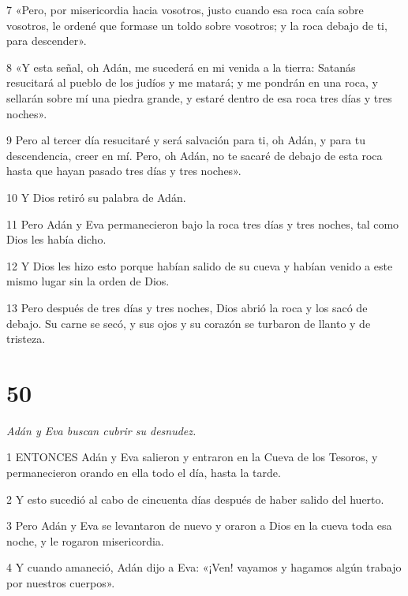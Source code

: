 \par 7 «Pero, por misericordia hacia vosotros, justo cuando esa roca caía sobre vosotros, le ordené que formase un toldo sobre vosotros; y la roca debajo de ti, para descender».

\par 8 «Y esta señal, oh Adán, me sucederá en mi venida a la tierra: Satanás resucitará al pueblo de los judíos y me matará; y me pondrán en una roca, y sellarán sobre mí una piedra grande, y estaré dentro de esa roca tres días y tres noches».

\par 9 Pero al tercer día resucitaré y será salvación para ti, oh Adán, y para tu descendencia, creer en mí. Pero, oh Adán, no te sacaré de debajo de esta roca hasta que hayan pasado tres días y tres noches».

\par 10 Y Dios retiró su palabra de Adán.

\par 11 Pero Adán y Eva permanecieron bajo la roca tres días y tres noches, tal como Dios les había dicho.

\par 12 Y Dios les hizo esto porque habían salido de su cueva y habían venido a este mismo lugar sin la orden de Dios.

\par 13 Pero después de tres días y tres noches, Dios abrió la roca y los sacó de debajo. Su carne se secó, y sus ojos y su corazón se turbaron de llanto y de tristeza.

\chapter{50}

\par \textit{Adán y Eva buscan cubrir su desnudez.}

\par 1 ENTONCES Adán y Eva salieron y entraron en la Cueva de los Tesoros, y permanecieron orando en ella todo el día, hasta la tarde.

\par 2 Y esto sucedió al cabo de cincuenta días después de haber salido del huerto.

\par 3 Pero Adán y Eva se levantaron de nuevo y oraron a Dios en la cueva toda esa noche, y le rogaron misericordia.

\par 4 Y cuando amaneció, Adán dijo a Eva: «¡Ven! vayamos y hagamos algún trabajo por nuestros cuerpos».

